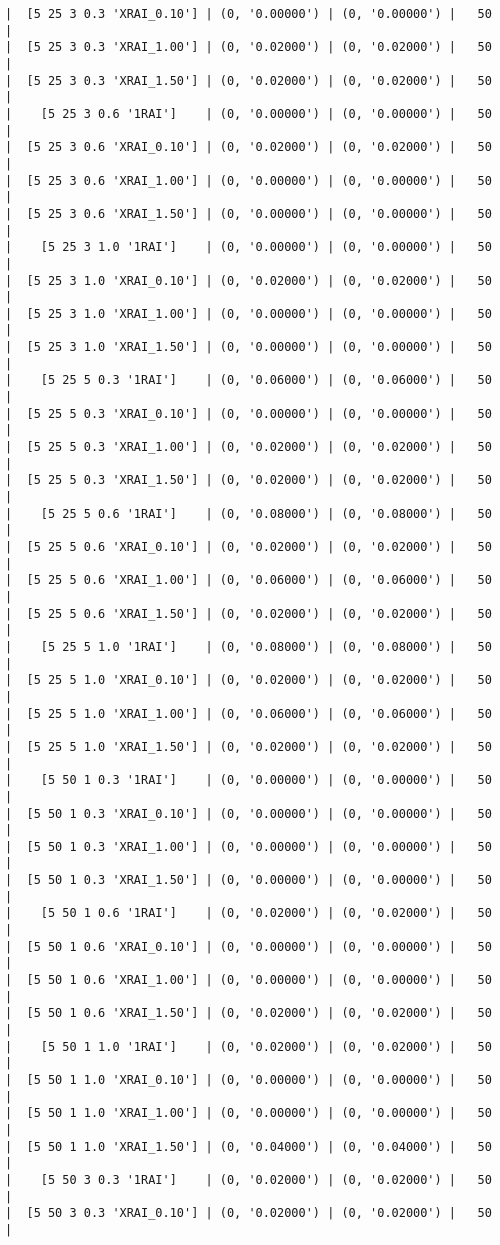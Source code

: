 \documentclass{article}
\begin{document}
\begin{verbatim}
|  [5 25 3 0.3 'XRAI_0.10'] | (0, '0.00000') | (0, '0.00000') |   50  |
|  [5 25 3 0.3 'XRAI_1.00'] | (0, '0.02000') | (0, '0.02000') |   50  |
|  [5 25 3 0.3 'XRAI_1.50'] | (0, '0.02000') | (0, '0.02000') |   50  |
|    [5 25 3 0.6 '1RAI']    | (0, '0.00000') | (0, '0.00000') |   50  |
|  [5 25 3 0.6 'XRAI_0.10'] | (0, '0.02000') | (0, '0.02000') |   50  |
|  [5 25 3 0.6 'XRAI_1.00'] | (0, '0.00000') | (0, '0.00000') |   50  |
|  [5 25 3 0.6 'XRAI_1.50'] | (0, '0.00000') | (0, '0.00000') |   50  |
|    [5 25 3 1.0 '1RAI']    | (0, '0.00000') | (0, '0.00000') |   50  |
|  [5 25 3 1.0 'XRAI_0.10'] | (0, '0.02000') | (0, '0.02000') |   50  |
|  [5 25 3 1.0 'XRAI_1.00'] | (0, '0.00000') | (0, '0.00000') |   50  |
|  [5 25 3 1.0 'XRAI_1.50'] | (0, '0.00000') | (0, '0.00000') |   50  |
|    [5 25 5 0.3 '1RAI']    | (0, '0.06000') | (0, '0.06000') |   50  |
|  [5 25 5 0.3 'XRAI_0.10'] | (0, '0.00000') | (0, '0.00000') |   50  |
|  [5 25 5 0.3 'XRAI_1.00'] | (0, '0.02000') | (0, '0.02000') |   50  |
|  [5 25 5 0.3 'XRAI_1.50'] | (0, '0.02000') | (0, '0.02000') |   50  |
|    [5 25 5 0.6 '1RAI']    | (0, '0.08000') | (0, '0.08000') |   50  |
|  [5 25 5 0.6 'XRAI_0.10'] | (0, '0.02000') | (0, '0.02000') |   50  |
|  [5 25 5 0.6 'XRAI_1.00'] | (0, '0.06000') | (0, '0.06000') |   50  |
|  [5 25 5 0.6 'XRAI_1.50'] | (0, '0.02000') | (0, '0.02000') |   50  |
|    [5 25 5 1.0 '1RAI']    | (0, '0.08000') | (0, '0.08000') |   50  |
|  [5 25 5 1.0 'XRAI_0.10'] | (0, '0.02000') | (0, '0.02000') |   50  |
|  [5 25 5 1.0 'XRAI_1.00'] | (0, '0.06000') | (0, '0.06000') |   50  |
|  [5 25 5 1.0 'XRAI_1.50'] | (0, '0.02000') | (0, '0.02000') |   50  |
|    [5 50 1 0.3 '1RAI']    | (0, '0.00000') | (0, '0.00000') |   50  |
|  [5 50 1 0.3 'XRAI_0.10'] | (0, '0.00000') | (0, '0.00000') |   50  |
|  [5 50 1 0.3 'XRAI_1.00'] | (0, '0.00000') | (0, '0.00000') |   50  |
|  [5 50 1 0.3 'XRAI_1.50'] | (0, '0.00000') | (0, '0.00000') |   50  |
|    [5 50 1 0.6 '1RAI']    | (0, '0.02000') | (0, '0.02000') |   50  |
|  [5 50 1 0.6 'XRAI_0.10'] | (0, '0.00000') | (0, '0.00000') |   50  |
|  [5 50 1 0.6 'XRAI_1.00'] | (0, '0.00000') | (0, '0.00000') |   50  |
|  [5 50 1 0.6 'XRAI_1.50'] | (0, '0.02000') | (0, '0.02000') |   50  |
|    [5 50 1 1.0 '1RAI']    | (0, '0.02000') | (0, '0.02000') |   50  |
|  [5 50 1 1.0 'XRAI_0.10'] | (0, '0.00000') | (0, '0.00000') |   50  |
|  [5 50 1 1.0 'XRAI_1.00'] | (0, '0.00000') | (0, '0.00000') |   50  |
|  [5 50 1 1.0 'XRAI_1.50'] | (0, '0.04000') | (0, '0.04000') |   50  |
|    [5 50 3 0.3 '1RAI']    | (0, '0.02000') | (0, '0.02000') |   50  |
|  [5 50 3 0.3 'XRAI_0.10'] | (0, '0.02000') | (0, '0.02000') |   50  |

\end{verbatim}
\end{document}
